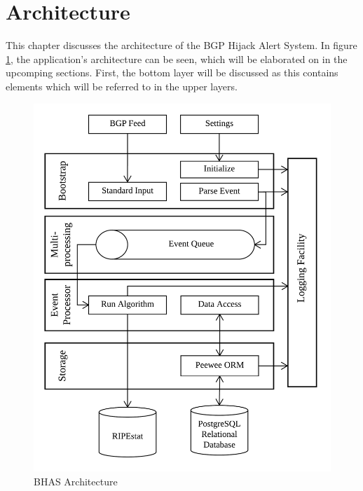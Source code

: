 \section{Architecture}\label{sec:architecture}
This chapter discusses the architecture of the BGP Hijack Alert System. In figure \ref{fig:bhasarchitecture}, the application's architecture can be seen, which will be elaborated on in the upcomping sections. First, the bottom layer will be discussed as this contains elements which will be referred to in the upper layers.

\begin{figure}[hb!]
\RawFloats
\centering
\begin{minipage}{.5\textwidth}
    \centering
    \includegraphics[scale=0.13]{images/architecture.png}
    \caption{BHAS Architecture}
    \label{fig:bhasarchitecture}
\end{minipage}%
\begin{minipage}{.5\textwidth}
    \centering

\end{minipage}
\end{figure}
